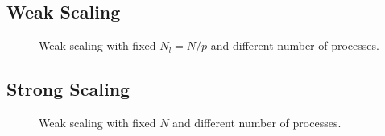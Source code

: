 \documentclass[11pt, oneside]{article}   	%
\begin{document}
\subsection{Weak Scaling}
\begin{figure}[ht]
\centering
{}
\caption{Weak scaling with fixed $N_l = N/p$ and different number of processes.}
\end{figure}
\subsection{Strong Scaling}
\begin{figure}[ht]
\centering
{}
\caption{Weak scaling with fixed $N$ and different number of processes.}
\end{figure}
\end{document}
